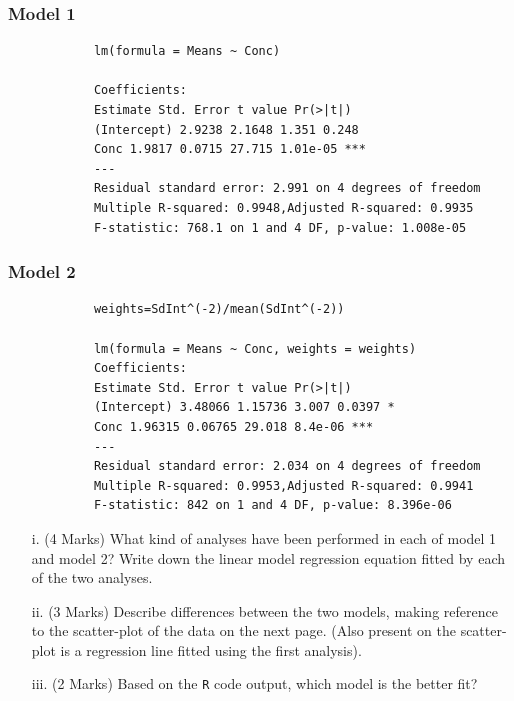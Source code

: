 \documentclass[a4paper,12pt]{article}
\begin{document}
	\subsubsection*{Model 1}
		\begin{framed}
			
			
			
			\begin{verbatim}
			lm(formula = Means ~ Conc)
			
			Coefficients:
			Estimate Std. Error t value Pr(>|t|)
			(Intercept) 2.9238 2.1648 1.351 0.248
			Conc 1.9817 0.0715 27.715 1.01e-05 ***
			---
			Residual standard error: 2.991 on 4 degrees of freedom
			Multiple R-squared: 0.9948,Adjusted R-squared: 0.9935
			F-statistic: 768.1 on 1 and 4 DF, p-value: 1.008e-05
			\end{verbatim}
		\end{framed}
		\subsubsection*{Model 2}
		\begin{framed}
		
			\begin{verbatim}
			weights=SdInt^(-2)/mean(SdInt^(-2))
			
			lm(formula = Means ~ Conc, weights = weights)
			Coefficients:
			Estimate Std. Error t value Pr(>|t|)
			(Intercept) 3.48066 1.15736 3.007 0.0397 *
			Conc 1.96315 0.06765 29.018 8.4e-06 ***
			---
			Residual standard error: 2.034 on 4 degrees of freedom
			Multiple R-squared: 0.9953,Adjusted R-squared: 0.9941
			F-statistic: 842 on 1 and 4 DF, p-value: 8.396e-06
			\end{verbatim}
		\end{framed}
	\begin{itemize}
		\item[i.] (4 Marks) What kind of analyses have been performed in each of model 1 and model 2? Write down the linear model regression equation fitted by each of the two analyses.
		
		\item[ii.] (3 Marks) Describe differences between the two models, making reference to the scatter-plot of the data on the next page. (Also present on the scatter-plot is a regression line fitted using the first analysis).
		\item[iii.] (2 Marks) Based on the \texttt{R} code output, which model is the better fit?
	\end{itemize}
\end{document}
